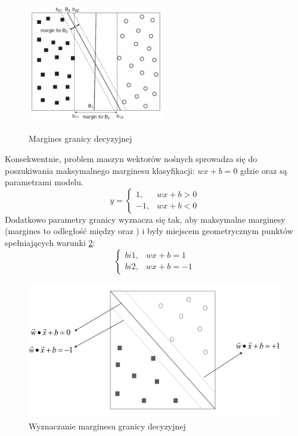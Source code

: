 \begin{figure}[h] 
        \centering\includegraphics[width=6cm,height=6cm]{figures/SVM-margin.png}
        \caption{Margines granicy decyzyjnej}\label{SVM-margines}
\end{figure}
Konsekwentnie, problem maszyn wektorów nośnych sprowadza się do poszukiwania maksymalnego marginesu klasyfikacji: $w x + b = 0$ gdzie  oraz  są parametrami modelu.
\[
y = 
    \begin{cases}
            1,&  wx+b > 0\\
            -1,& wx+b < 0
    \end{cases}
\]
Dodatkowo parametry granicy wyznacza się tak, aby maksymalne marginesy (margines to odległość między  oraz )  i  były miejscem geometrycznym punktów  spełniających warunki \ref{SVM-marginesEq}:
\[
    \begin{cases}
            bi1,&  wx+b = 1\\
            bi2,& wx+b= -1
    \end{cases}
\]
\begin{figure}[h] 
        \centering\includegraphics[width=14cm,height=6cm]{figures/SVM-marginEq.png}
        \caption{Wyznaczanie marginesu granicy decyzyjnej}\label{SVM-marginesEq}
\end{figure}
